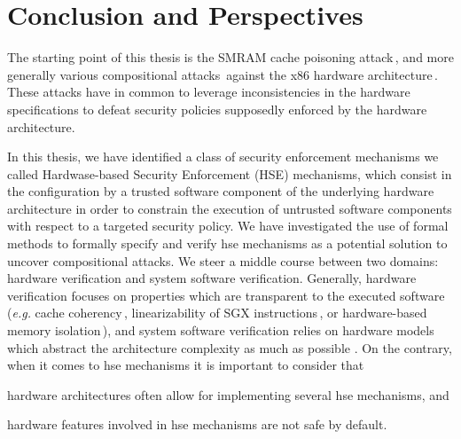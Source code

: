 \chapter{Conclusion and Perspectives}
\label{chapter:conclusion}


\vspace{1cm}%
\noindent
%
The starting point of this thesis is the SMRAM cache poisoning
attack\,\cite{duflot2009smram,wojtczuk2009smram}, and more generally various
compositional attacks\,\cite{wing2003compositionalattack} against the x86
hardware
architecture\,\cite{kovah2015senter,domas2015sinkhole,kallenberg2015racecondition}.
%
These attacks have in common to leverage inconsistencies in the hardware
specifications to defeat security policies supposedly enforced by the hardware
architecture.

In this thesis, we have identified a class of security enforcement mechanisms we
called Hardwase-based Security Enforcement (HSE) mechanisms, which consist in
the configuration by a trusted software component of the underlying hardware
architecture in order to constrain the execution of untrusted software
components with respect to a targeted security policy.
%
We have investigated the use of formal methods to formally specify and verify
\ac{hse} mechanisms as a potential solution to uncover compositional attacks.
%
We steer a middle course between two domains: hardware verification and system
software verification.
%
Generally, hardware verification focuses on properties which are transparent to
the executed software (\emph{e.g.} cache
coherency\,\cite{stern1995cachecoherence}, linearizability of SGX
instructions\,\cite{leslie2015linsgx}, or hardware-based memory
isolation\,\cite{lie2003xom}), and system software verification relies on
hardware models which abstract the architecture complexity as much as possible .
%
On the contrary, when it comes to \ac{hse} mechanisms it is important to
consider that
%
\begin{inparaenum}[(1)]
\item \label{needreuse}%
  hardware architectures often allow for implementing several \ac{hse}
  mechanisms, and
\item \label{needreduce}%
  hardware features involved in \ac{hse} mechanisms are not safe by default.
\end{inparaenum}

